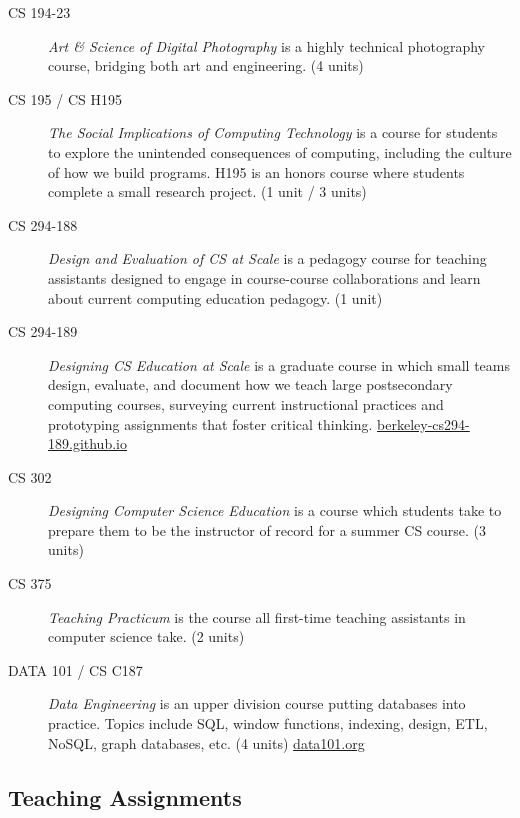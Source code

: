 \begin{description}
    \item[CS 194-23] \textit{Art \& Science of Digital Photography} is a highly technical photography course, bridging both art and engineering. (4 units)
    
    \item[CS 195 / CS H195] \textit{The Social Implications of Computing Technology} is a course for students to explore the unintended consequences of computing, including the culture of how we build programs. H195 is an honors course where students complete a small research project. (1 unit / 3 units)
    
    \item[CS 294-188] \textit{Design and Evaluation of CS at Scale} is a pedagogy course for teaching assistants designed to engage in course-course collaborations and learn about current computing education pedagogy.  (1 unit)

    \item[CS 294-189] \textit{Designing CS Education at Scale} is a graduate course in which small teams design, evaluate, and document how we teach large postsecondary computing courses, surveying current instructional practices and prototyping assignments that foster critical thinking. \small{\href{https://berkeley-cs294-189.github.io}{berkeley-cs294-189.github.io}}
    
    \item[CS 302] \textit{Designing Computer Science Education} is a course which students take to prepare them to be the instructor of record for a summer CS course. (3 units)
    
    \item[CS 375] \textit{Teaching Practicum} is the course all first-time teaching assistants in computer science take. (2 units)

    \item[DATA 101 / CS C187] \textit{Data Engineering} is an upper division course putting databases into practice. Topics include SQL, window functions, indexing, design, ETL, NoSQL, graph databases, etc. (4 units) \small{\href{https://data101.org}{data101.org}}
\end{description}

\vspace{5pt}

\subsection{Teaching Assignments}

